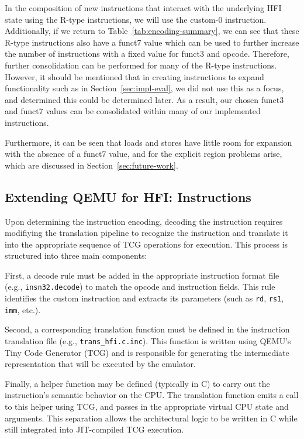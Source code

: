 \documentclass[conference,compsoc]{IEEEtran}
\begin{document}
In the composition of new instructions that interact with the underlying HFI state using the R-type instructions, we will use the custom-0 instruction.
Additionally, if we return to Table~\ref{tab:encoding-summary}, we can see that these R-type instructions also have a funct7 value which can be used to further increase the number of instructions with a fixed value for funct3 and opcode. 
Therefore, further consolidation can be performed for many of the R-type instructions. 
However, it should be mentioned that in creating instructions to expand functionality such as in Section~\ref{sec:impl-eval}, we did not use this as a focus, and determined this could be determined later.
As a result, our chosen funct3 and funct7 values can be consolidated within many of our implemented instructions.

Furthermore, it can be seen that loads and stores have little room for expansion with the absence of a funct7 value, and for the explicit region problems arise, which are discussed in Section~\ref{sec:future-work}. 

\subsection{Extending QEMU for HFI: Instructions}
Upon determining the instruction encoding, decoding the instruction requires modifiying the translation pipeline to recognize the instruction and translate it into the appropriate sequence of TCG operations for execution. This process is structured into three main components:

First, a decode rule must be added in the appropriate instruction format file (e.g., \texttt{insn32.decode}) to match the opcode and instruction fields. This rule identifies the custom instruction and extracts its parameters (such as \texttt{rd}, \texttt{rs1}, \texttt{imm}, etc.).

Second, a corresponding translation function must be defined in the instruction translation file (e.g., \texttt{trans\_hfi.c.inc}). This function is written using QEMU's Tiny Code Generator (TCG) and is responsible for generating the intermediate representation that will be executed by the emulator.

Finally, a helper function may be defined (typically in C) to carry out the instruction's semantic behavior on the CPU. The translation function emits a call to this helper using TCG, and passes in the appropriate virtual CPU state and arguments. This separation allows the architectural logic to be written in C while still integrated into JIT-compiled TCG execution.
\end{document}
